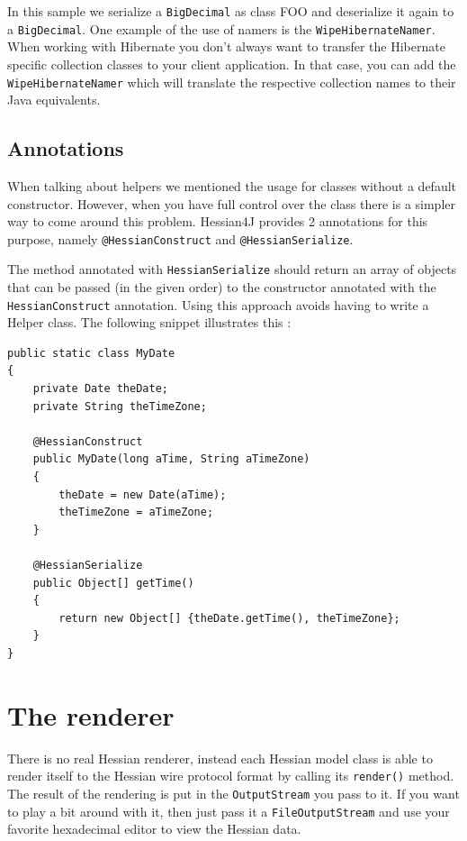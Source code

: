 \documentclass[a4paper]{article}
\begin{document}
In this sample we serialize a \lstinline$BigDecimal$ as class FOO and deserialize it again to a \lstinline$BigDecimal$.  One example of the use of namers is the \lstinline$WipeHibernateNamer$. When working with Hibernate you don't always want to transfer the Hibernate specific collection classes to your client application. In that case, you can add the \lstinline$WipeHibernateNamer$ which will translate the respective collection names to their Java equivalents. 

\subsection{Annotations}

When talking about helpers we mentioned the usage for classes without a default constructor. However, when you have full control over the class there is a simpler way to come around this problem. Hessian4J provides 2 annotations for this purpose, namely \lstinline$@HessianConstruct$ and \lstinline$@HessianSerialize$.


The method annotated with \lstinline$HessianSerialize$ should return an array of objects that can be passed (in the given order) to the constructor annotated with the \lstinline$HessianConstruct$ annotation. Using this approach avoids having to write a Helper class. 
The following snippet illustrates this :

\medskip
\begin{lstlisting}
public static class MyDate
{
    private Date theDate;
    private String theTimeZone;

    @HessianConstruct
    public MyDate(long aTime, String aTimeZone)
    {
        theDate = new Date(aTime);
        theTimeZone = aTimeZone;
    }

    @HessianSerialize
    public Object[] getTime()
    {
        return new Object[] {theDate.getTime(), theTimeZone};
    }
}
\end{lstlisting}
\medskip
    
\section{The renderer}

There is no real Hessian renderer, instead each Hessian model class is able to render itself to the Hessian wire protocol format by calling its \lstinline$render()$ method. The result of the rendering is put in the \lstinline$OutputStream$ you pass to it. If you want to play a bit around with it, then just pass it a \lstinline$FileOutputStream$ and use your favorite hexadecimal editor to view the Hessian data.
\end{document}
